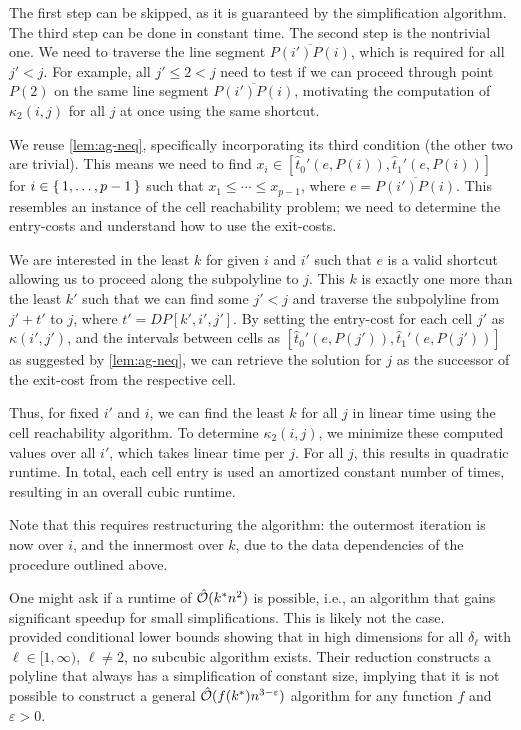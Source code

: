 The first step can be skipped, as it is guaranteed by the simplification algorithm. The third step can be done in constant time. The second step is the nontrivial one. We need to traverse the line segment \(\overline{P(i')P(i)}\), which is required for all \(j' < j\). For example, all \(j' \leq 2 < j\) need to test if we can proceed through point \(P(2)\) on the same line segment \(\overline{P(i')P(i)}\), motivating the computation of \(\kappa_2(i, j)\) for all \(j\) at once using the same shortcut. 

We reuse \cref{lem:ag-neq}, specifically incorporating its third condition (the other two are trivial). This means we need to find \(x_i \in [\hat t_0'(e, P(i)), \hat t_1'(e, P(i))]\) for \(i \in \set{1, \dots, p - 1}\) such that \(x_1 \leq \cdots \leq x_{p-1}\), where \(e = \overline{P(i')P(i)}\). This resembles an instance of the cell reachability problem; we need to determine the entry-costs and understand how to use the exit-costs.

We are interested in the least \(k\) for given \(i\) and \(i'\) such that \(e\) is a valid shortcut allowing us to proceed along the subpolyline to \(j\). This \(k\) is exactly one more than the least \(k'\) such that we can find some \(j' < j\) and traverse the subpolyline from \(j' + t'\) to \(j\), where \(t' = DP[k', i', j']\). By setting the entry-cost for each cell \(j'\) as \(\kappa(i',j')\), and the intervals between cells as \([\hat t_0'(e, P(j')), \hat t_1'(e, P(j'))]\) as suggested by \cref{lem:ag-neq}, we can retrieve the solution for \(j\) as the successor of the exit-cost from the respective cell.

Thus, for fixed \(i'\) and \(i\), we can find the least \(k\) for all \(j\) in linear time using the cell reachability algorithm. To determine \(\kappa_2(i, j)\), we minimize these computed values over all \(i'\), which takes linear time per \(j\). For all \(j\), this results in quadratic runtime. In total, each cell entry is used an amortized constant number of times, resulting in an overall cubic runtime.

Note that this requires restructuring the algorithm: the outermost iteration is now over \(i\), and the innermost over \(k\), due to the data dependencies of the procedure outlined above. 

One might ask if a runtime of \(\hat{\mathcal{O}}(k^*n^2)\) is possible, i.e., an algorithm that gains significant speedup for small simplifications. This is likely not the case. \citeauthor{polyline_simplification_has_cubic_complexity_bringmannetal}~\cite{polyline_simplification_has_cubic_complexity_bringmannetal} provided conditional lower bounds showing that in high dimensions for all \(\delta_\ell\) with \(\ell \in [1, \infty)\), \(\ell \neq 2\), no subcubic algorithm exists. Their reduction constructs a polyline that always has a simplification of constant size, implying that it is not possible to construct a general \(\hat{\mathcal{O}}(f(k^*)n^{3-\varepsilon})\) algorithm for any function \(f\) and \(\varepsilon > 0\).
